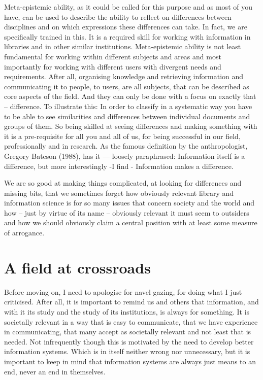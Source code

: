 \documentclass[a4paper,
fontsize=11pt,
oneside,
numbers=noperiodatend,
parskip=half-,
bibliography=totoc,
final
]{scrartcl}
\begin{document}
Meta-epistemic ability, as it could be called for this purpose and as
most of you have, can be used to describe the ability to reflect on
differences between disciplines and on which expressions these
differences can take. In fact, we are specifically trained in this. It
is a required skill for working with information in libraries and in
other similar institutions. Meta-epistemic ability is not least
fundamental for working within different subjects and areas and most
importantly for working with different users with divergent needs and
requirements. After all, organising knowledge and retrieving information
and communicating it to people, to users, are all subjects, that can be
described as core aspects of the field. And they can only be done with a
focus on exactly that -- difference. To illustrate this: In order to
classify in a systematic way you have to be able to see similarities and
differences between individual documents and groups of them. So being
skilled at seeing differences and making something with it is a
pre-requisite for all you and all of us, for being successful in our
field, professionally and in research. As the famous definition by the
anthropologist, Gregory Bateson (1988), has it --- loosely paraphrased:
Information itself is a difference, but more interestingly -I find -
Information makes a difference.

We are so good at making things complicated, at looking for differences
and missing bits, that we sometimes forget how obviously relevant
library and information science is for so many issues that concern
society and the world and how -- just by virtue of its name -- obviously
relevant it must seem to outsiders and how we should obviously claim a
central position with at least some measure of arrogance.

\section*{A field at crossroads}\label{a-field-at-crossroads}

Before moving on, I need to apologise for navel gazing, for doing what I
just criticised. After all, it is important to remind us and others that
information, and with it its study and the study of its institutions, is
always for something. It is societally relevant in a way that is easy to
communicate, that we have experience in communicating, that many accept
as societally relevant and not least that is needed. Not infrequently
though this is motivated by the need to develop better information
systems. Which is in itself neither wrong nor unnecessary, but it is
important to keep in mind that information systems are always just means
to an end, never an end in themselves.
\end{document}
